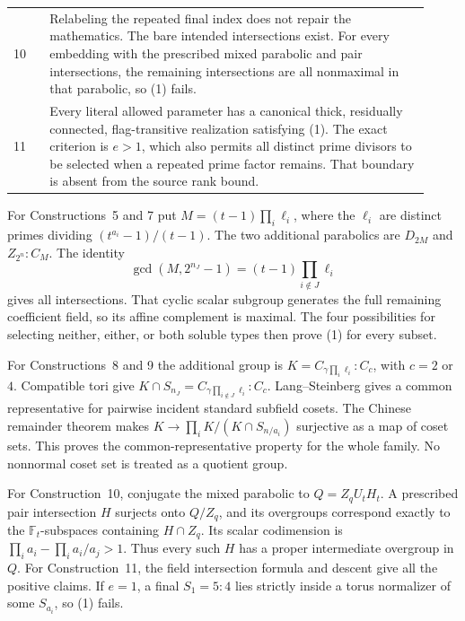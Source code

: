 \documentclass[11pt,a4paper]{article}
\begin{document}
\begin{longtable}{p{0.08\linewidth}p{0.84\linewidth}}
10 & Relabeling the repeated final index does not repair the mathematics.
The bare intended intersections exist. For every embedding with the
prescribed mixed parabolic and pair intersections, the remaining
intersections are all nonmaximal in that parabolic, so (1) fails.\\
11 & Every literal allowed parameter has a canonical thick, residually
connected, flag-transitive realization satisfying (1). The exact
criterion is $e>1$, which also permits all distinct prime divisors to be
selected when a repeated prime factor remains. That boundary is absent
from the source rank bound.\\\bottomrule
\end{longtable}

For Constructions~5 and 7 put $M=(t-1)\prod_i\ell_i$, where the
$\ell_i$ are distinct primes dividing $(t^{a_i}-1)/(t-1)$.
The two additional parabolics are $D_{2M}$ and $Z_{2^n}:C_M$.
The identity
\[
 \gcd(M,2^{n_J}-1)=(t-1)\prod_{i\notin J}\ell_i
\]
gives all intersections. That cyclic scalar subgroup generates the full
remaining coefficient field, so its affine complement is maximal.
The four possibilities for selecting neither, either, or both soluble
types then prove (1) for every subset.

For Constructions~8 and 9 the additional group is
$K=C_{\gamma\prod_i\ell_i}:C_c$, with $c=2$ or $4$.
Compatible tori give
$K\cap S_{n_J}=C_{\gamma\prod_{i\notin J}\ell_i}:C_c$.
Lang--Steinberg gives a common representative for pairwise incident
standard subfield cosets. The Chinese remainder theorem makes
$K\longrightarrow\prod_i K/(K\cap S_{n/a_i})$ surjective as a
map of coset sets. This proves the common-representative property for
the whole family. No nonnormal coset set is treated as a quotient group.

For Construction~10, conjugate the mixed parabolic to
$Q=Z_qU_tH_t$. A prescribed pair intersection $H$ surjects onto
$Q/Z_q$, and its overgroups correspond exactly to the
$\mathbb F_t$-subspaces containing $H\cap Z_q$.
Its scalar codimension is
$\prod_i a_i-\prod_i a_i/a_j>1$.
Thus every such $H$ has a proper intermediate overgroup in $Q$.
For Construction~11, the field intersection formula and descent give
all the positive claims. If $e=1$, a final $S_1=5:4$ lies strictly
inside a torus normalizer of some $S_{a_i}$, so (1) fails.
\end{document}
